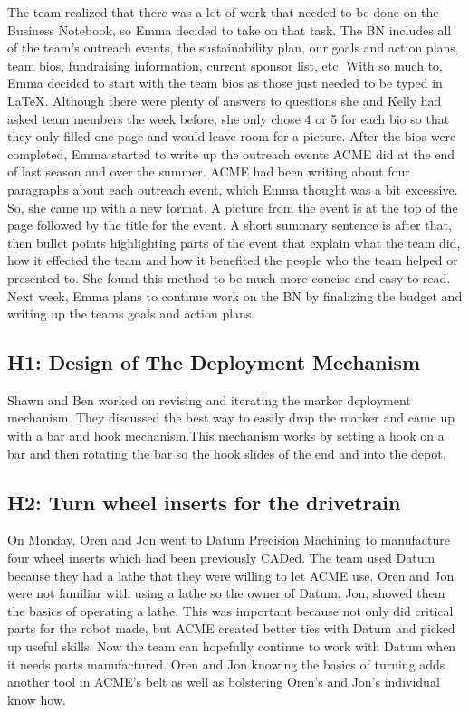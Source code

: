 \documentclass{article}
\begin{document}
The team realized that there was a lot of work that needed to be done on the Business Notebook, so Emma decided to take on that task. The BN includes all of the team's outreach events, the sustainability plan, our goals and action plans, team bios, fundraising information, current sponsor list, etc. With so much to, Emma decided to start with the team bios as those just needed to be typed in \LaTeX . Although there were plenty of answers to questions she and Kelly had asked team members the week before, she only chose 4 or 5 for each bio so that they only filled one page and would leave room for a picture. After the bios were completed, Emma started to write up the outreach events ACME did at the end of last season and over the summer. ACME had been writing about four paragraphs about each outreach event, which Emma thought was a bit excessive. So, she came up with a new format. A picture from the event is at the top of the page followed by the title for the event. A short summary sentence is after that, then bullet points highlighting parts of the event that explain what the team did, how it effected the team and how it benefited the people who the team helped or presented to. She found this method to be much more concise and easy to read. Next week, Emma plans to continue work on the BN by finalizing the budget and writing up the teams goals and action plans. \subsection{H1: Design of The Deployment Mechanism}

Shawn and Ben worked on revising and iterating the marker deployment mechanism. They discussed the best way to easily drop the marker and came up with a bar and hook mechanism.This mechanism works by setting a hook on a bar and then rotating the bar so the hook slides of the end and into the depot.

\subsection{H2: Turn wheel inserts for the drivetrain}

On Monday, Oren and Jon went to Datum Precision Machining to manufacture four wheel inserts which had been previously CADed. The team used Datum because they had a lathe that they were willing to let ACME use. Oren and Jon were not familiar with using a lathe so the owner of Datum, Jon, showed them the basics of operating a lathe. This was important because not only did critical parts for the robot made, but ACME created better ties with Datum and picked up useful skills. Now the team can hopefully continue to work with Datum when it needs parts manufactured. Oren and Jon knowing the basics of turning adds another tool in ACME’s belt as well as bolstering Oren’s and Jon’s individual know how.
\end{document}
